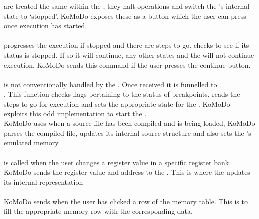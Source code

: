 %
 are treated the same within the , they halt operations and switch the 's internal state to `stopped'. KoMoDo exposes these as a button which the user can press once execution has started.\\\\
%
 progresses the execution if stopped and there are steps to go.  checks to see if its status is stopped. If so it will continue, any other states and the  will not continue execution. KoMoDo sends this command if the user presses the continue button.\\\\
%
 is not conventionally handled by the . Once received it is funnelled to \\. This function checks flags pertaining to the status of breakpoints, reads the steps to go for execution and sets the appropriate state for the . KoMoDo exploits this odd implementation to start the .\\
%
%
%
%
KoMoDo uses  when a  source file has been compiled and is being loaded, KoMoDo parses the compiled  file, updates its internal source structure and also sets the 's emulated memory.\\\\
%
 is called when the user changes a register value in a specific register bank. KoMoDo sends the register value and address to the . This is where the  updates its internal representation\\\\
%
KoMoDo sends  when the user has clicked a row of the memory table. This is to fill the appropriate memory row with the corresponding data.\\\\
